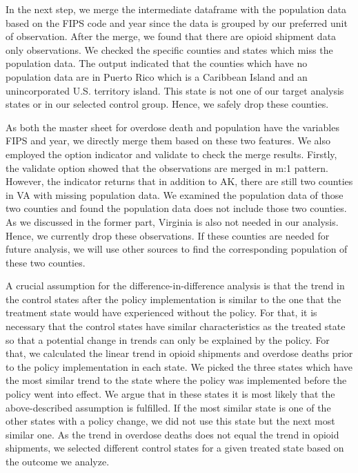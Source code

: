 \documentclass[12pt,letterpaper]{article}
\begin{document}
In the next step, we merge the intermediate dataframe with the population data based on the FIPS code and year since the data is grouped by our preferred unit of observation. After the merge, we found that there are opioid shipment data only observations. We checked the specific counties and states which miss the population data. The output indicated that the counties which have no population data are in Puerto Rico which is a Caribbean Island and an unincorporated U.S. territory island. This state is not one of our target analysis states or in our selected control group. Hence, we safely drop these counties.

As both the master sheet for overdose death and population have the variables FIPS and year, we directly merge them based on these two features. We also employed the option indicator and validate to check the merge results. Firstly, the validate option showed that the observations are merged in m:1 pattern. However, the indicator returns that in addition to AK, there are still two counties in VA with missing population data. We examined the population data of those two counties and found the population data does not include those two counties. As we discussed in the former part, Virginia is also not needed in our analysis. Hence, we currently drop these observations. If these counties are needed for future analysis, we will use other sources to find the corresponding population of these two counties.

A crucial assumption for the difference-in-difference analysis is that the trend in the control states after the policy implementation is similar to the one that the treatment state would have experienced without the policy. For that, it is necessary that the control states have similar characteristics as the treated state so that a potential change in trends can only be explained by the policy. For that, we calculated the linear trend in opioid shipments and overdose deaths prior to the policy implementation in each state. We picked the three states which have the most similar trend to the  state where the policy was implemented before the policy went into effect.  We argue that in these states it is most likely that the above-described assumption is fulfilled. If the most similar state is one of the other states with a policy change, we did not use this state but the next most similar one. As the trend in overdose deaths does not equal the trend in opioid shipments, we selected different control states for a given treated state based on the outcome we analyze.
\end{document}
